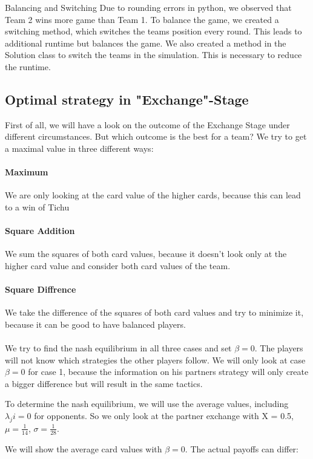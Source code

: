 Balancing and Switching
Due to rounding errors in python, we observed that Team 2 wins more game than Team 1. 
To balance the game, we created a switching method, which switches the teams position every round. This leads to additional runtime but balances the game. 
We also created a method in the Solution class to switch the teams in the simulation. This is necessary to reduce the runtime. 
\subsection{Optimal strategy in "Exchange"-Stage}
First of all, we will have a look on the outcome of the Exchange Stage under different circumstances. But which outcome is the best for a team? We try to get a maximal value in three different ways:

\paragraph{Maximum}  We are only looking at the card value of the higher cards, because this can lead to a win of Tichu
\paragraph{Square Addition}  We sum the squares of both card values, because it doesn’t look only at the higher card value and consider both card values of the team.
\paragraph{Square Diffrence} We take the difference of the squares of both card values and try to minimize it, because it can be good to have balanced players. 
\\
\\
We try to find the nash equilibrium in all three cases and set $\beta = 0$. The players will not know which strategies the other players follow. We will only look at case $\beta = 0$ for case 1, because the information on his partners strategy will only create a bigger difference but will result in the same tactics. 

To determine the nash equilibrium, we will use the average values, including $\lambda_ji = 0$ for opponents. So we only look at the partner exchange with X = 0.5, $\mu = \frac{1}{14}$, $\sigma = \frac{1}{28}$.

We will show the average card values with $\beta =0$. The actual payoffs can differ:
\begin{table}[h]
\end{table}

